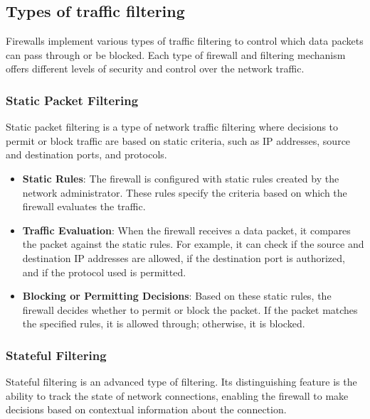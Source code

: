 \subsection{Types of traffic filtering}
Firewalls implement various types of traffic filtering to control which data packets can pass through or be blocked. Each type of firewall and filtering mechanism offers different levels of security and control over the network traffic.

\subsubsection{Static Packet Filtering}
Static packet filtering is a type of network traffic filtering where decisions to permit or block traffic are based on static criteria, such as IP addresses, source and destination ports, and protocols.

\begin{itemize}
    \item \textbf{Static Rules}: The firewall is configured with static rules created by the network administrator. These rules specify the criteria based on which the firewall evaluates the traffic.
    \item \textbf{Traffic Evaluation}: When the firewall receives a data packet, it compares the packet against the static rules. For example, it can check if the source and destination IP addresses are allowed, if the destination port is authorized, and if the protocol used is permitted.
    \item \textbf{Blocking or Permitting Decisions}: Based on these static rules, the firewall decides whether to permit or block the packet. If the packet matches the specified rules, it is allowed through; otherwise, it is blocked.
\end{itemize}

\subsubsection{Stateful Filtering}
Stateful filtering is an advanced type of filtering. Its distinguishing feature is the ability to track the state of network connections, enabling the firewall to make decisions based on contextual information about the connection.

